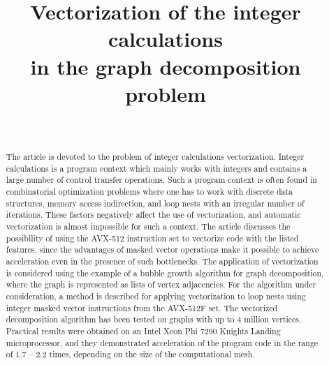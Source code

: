 \documentclass[
11pt,%
tightenlines,%
twoside,%
onecolumn,%
nofloats,%
nobibnotes,%
nofootinbib,%
superscriptaddress,%
noshowpacs,%
centertags]%
{revtex4}
\begin{document}

\title{Vectorization of the integer calculations \\ in the graph decomposition problem}

\author{~}




\begin{abstract} %
The article is devoted to the problem of integer calculations vectorization.
Integer calculations is a program context which mainly works with integers and contains a large number of control transfer operations.
Such a program context is often found in combinatorial optimization problems where one has to work with discrete data structures, memory access indirection, and loop nests with an irregular number of iterations.
These factors negatively affect the use of vectorization, and automatic vectorization is almost impossible for such a context.
The article discusses the possibility of using the AVX-512 instruction set to vectorize code with the listed features, since the advantages of masked vector operations make it possible to achieve acceleration even in the presence of such bottlenecks.
The application of vectorization is considered using the example of a bubble growth algorithm for graph decomposition, where the graph is represented as lists of vertex adjacencies.
For the algorithm under consideration, a method is described for applying vectorization to loop nests using integer masked vector instructions from the AVX-512F set.
The vectorized decomposition algorithm has been tested on graphs with up to 4 million vertices.
Practical results were obtained on an Intel Xeon Phi 7290 Knights Landing microprocessor, and they demonstrated acceleration of the program code in the range of 1.7 -- 2.2 times, depending on the size of the computational mesh.
\end{abstract}
\end{document}
